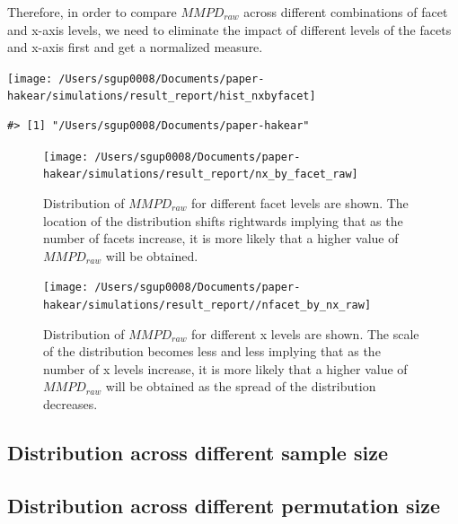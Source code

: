 \documentclass[
]{article}
\begin{document}
Therefore, in order to compare \(MMPD_{raw}\) across different combinations of facet and x-axis levels, we need to eliminate the impact of different levels of the facets and x-axis first and get a normalized measure.

\begin{center}\texttt{[image: /Users/sgup0008/Documents/paper-hakear/simulations/result\_report/hist\_nxbyfacet]} \end{center}

\begin{verbatim}
#> [1] "/Users/sgup0008/Documents/paper-hakear"
\end{verbatim}

\begin{figure}

{\centering \texttt{[image: /Users/sgup0008/Documents/paper-hakear/simulations/result\_report/nx\_by\_facet\_raw]} 

}

\caption{Distribution of $MMPD_{raw}$ for different facet levels are shown. The location of the distribution shifts rightwards implying that as the number of facets increase, it is more likely that a higher value of $MMPD_{raw}$ will be obtained.}\label{fig:dist-across-facets}
\end{figure}

\begin{figure}

{\centering \texttt{[image: /Users/sgup0008/Documents/paper-hakear/simulations/result\_report//nfacet\_by\_nx\_raw]} 

}

\caption{Distribution of $MMPD_{raw}$ for different x levels are shown. The scale of the distribution becomes less and less implying that as the number of x levels increase, it is more likely that a higher value of $MMPD_{raw}$ will be obtained as the spread of the distribution decreases. }\label{fig:dist-across-x}
\end{figure}

\hypertarget{distribution-across-different-sample-size}{%
\subsection{Distribution across different sample size}\label{distribution-across-different-sample-size}}

\hypertarget{distribution-across-different-permutation-size}{%
\subsection{Distribution across different permutation size}\label{distribution-across-different-permutation-size}}
\end{document}
